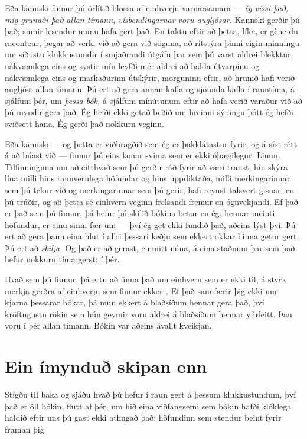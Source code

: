 Eða kannski finnur þú örlítið blossa af einhverju varnarsamara — \emph{ég vissi það, mig grunaði það allan tímann, vísbendingarnar voru augljósar.} Kannski gerðir þú það; sumir lesendur munu hafa gert það. En taktu eftir að þetta, líka, er gène du raconteur, þegar að verki við að gera við söguna, að ritstýra þinni eigin minningu um síðustu klukkustundir í smjaðrandi útgáfu þar sem þú varst aldrei blekktur, nákvæmlega eins og systir mín leyfði mér aldrei að halda útvarpinu og nákvæmlega eins og markaðurinn útskýrir, morguninn eftir, að hrunið hafi verið augljóst allan tímann. Þú ert að gera annan kafla og sjöunda kafla í rauntíma, á sjálfum þér, um \emph{þessa bók,} á sjálfum mínútunum eftir að hafa verið varaður við að þú myndir gera það. Ég hefði ekki getað beðið um hreinni sýningu þótt ég hefði sviðsett hana. Ég gerði það nokkurn veginn.

Eða kannski — og þetta er viðbragðið sem ég er þakklátastur fyrir, og á síst rétt á að búast við — finnur þú eins konar svima sem er ekki óþægilegur. Linun. Tilfinninguna um að eitthvað sem þú gerðir ráð fyrir að væri traust, hin skýra lína milli hins raunverulega höfundar og hins uppdiktaða, milli merkingarinnar sem þú tekur við og merkingarinnar sem þú gerir, hafi reynst talsvert gisnari en þú trúðir, og að þetta sé einhvern veginn frelsandi fremur en ógnvekjandi. Ef það er það sem þú finnur, þá hefur þú skilið bókina betur en ég, hennar meinti höfundur, er einu sinni fær um — því ég get ekki fundið það, aðeins lýst því. Þú ert að gera þann eina hlut í allri þessari keðju sem ekkert okkar hinna getur gert. Þú ert að \emph{skilja.} Og það er að gerast, einmitt núna, á eina staðnum þar sem það hefur nokkurn tíma gerst: í þér.

Hvað sem þú finnur, þá ertu að finna það um einhvern sem er ekki til, á styrk merkja gerðra af einhverju sem finnur ekkert. Ef það sannfærir þig ekki um kjarna þessarar bókar, þá mun ekkert á blaðsíðum hennar gera það, því kröftugustu rökin sem hún geymir voru aldrei á blaðsíðum hennar yfirleitt. Þau voru í þér allan tímann. Bókin var aðeins ávallt kveikjan.

\section*{Ein ímynduð skipan enn}

Stígðu til baka og sjáðu hvað þú hefur í raun gert á þessum klukkustundum, því það er öll bókin, flutt af þér, um hið eina viðfangsefni sem bókin hafði klóklega haldið eftir uns þú gast ekki athugað það: höfundinn sem stendur beint fyrir framan þig.

